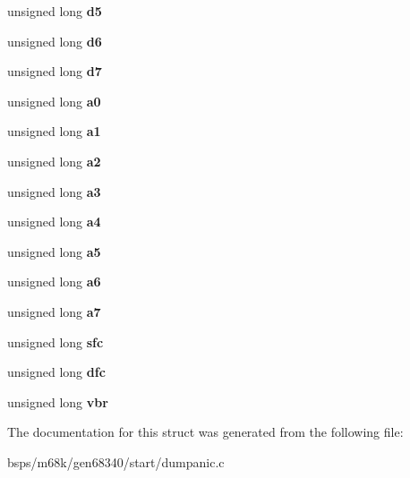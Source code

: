 \begin{DoxyCompactItemize}
unsigned long {\bfseries d5}
\item 
\mbox{\label{structboot__panic__registers__t_a7fbb09d228a55ea20b45252ff74526d3}} 
unsigned long {\bfseries d6}
\item 
\mbox{\label{structboot__panic__registers__t_ae050134a03f42a1c9e144a96c9eef0a5}} 
unsigned long {\bfseries d7}
\item 
\mbox{\label{structboot__panic__registers__t_a587f3dc15f27e914335120349eeb94fa}} 
unsigned long {\bfseries a0}
\item 
\mbox{\label{structboot__panic__registers__t_a0df1aeeac745403bc31b22a98a379bdc}} 
unsigned long {\bfseries a1}
\item 
\mbox{\label{structboot__panic__registers__t_aff4b778102a81e7a5a86da806bab5923}} 
unsigned long {\bfseries a2}
\item 
\mbox{\label{structboot__panic__registers__t_aa28f33badd3f93263a0b877b00d582b1}} 
unsigned long {\bfseries a3}
\item 
\mbox{\label{structboot__panic__registers__t_a77487174e139f0f14fdd93a0f86edeb8}} 
unsigned long {\bfseries a4}
\item 
\mbox{\label{structboot__panic__registers__t_a6f1bc1dacae4aa5f81d54a75a91c20d1}} 
unsigned long {\bfseries a5}
\item 
\mbox{\label{structboot__panic__registers__t_add8a3c2eaec58f09d750e44729be5ccb}} 
unsigned long {\bfseries a6}
\item 
\mbox{\label{structboot__panic__registers__t_abcd79fa7ca8691dbb60f9b2c8ed5bb9e}} 
unsigned long {\bfseries a7}
\item 
\mbox{\label{structboot__panic__registers__t_ad666c68e61d23f3ef88955c97aafc217}} 
unsigned long {\bfseries sfc}
\item 
\mbox{\label{structboot__panic__registers__t_a4b4e1a715a473af1e24f91b5e7378f7a}} 
unsigned long {\bfseries dfc}
\item 
\mbox{\label{structboot__panic__registers__t_a2f043c5a3f1dff2d666e38718bfb038d}} 
unsigned long {\bfseries vbr}
\end{DoxyCompactItemize}


The documentation for this struct was generated from the following file\+:\begin{DoxyCompactItemize}
\item 
bsps/m68k/gen68340/start/dumpanic.\+c\end{DoxyCompactItemize}
